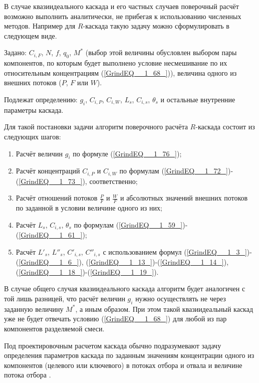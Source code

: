 В случае квазиидеального каскада и его частных случаев поверочный расчёт возможно выполнить аналитически, не прибегая к использованию численных методов. Например для $R$-каскада такую задачу можно сформулировать в следующем виде.

Задано: $C_{i,F}$, $N$, $f$, $q_0$, $M^{*}$ (выбор этой величины обусловлен выбором пары компонентов, по которым будет выполнено условие несмешивание по их относительным концентрациям (\ref{GrindEQ__1_68_})), величина одного из внешних потоков ($P$, $F$ или $W$).

Подлежат определению: $g_i$, $C_{i,P}$, $C_{i,W}$, $L_{s}$, $C_{i, s}$, $\theta_{s}$ и остальные внутренние параметры каскада.  

Для такой постановки задачи алгоритм поверочного расчёта $R$-каскада состоит из следующих шагов:

\begin{enumerate}
  \item Расчёт величин $g_i$ по формуле (\ref{GrindEQ__1_76_});
  \item Расчёт концентраций $C_{i,P}$ и $C_{i,W}$ по формулам (\ref{GrindEQ__1_72_})-(\ref{GrindEQ__1_73_}), соответственно;
  \item Расчёт отношений потоков  $\frac{P}{F}$ и $\frac{W}{F}$ и абсолютных значений внешних потоков по заданной в условии величине одного из них; 
  \item Расчёт $L_{s}$, $C_{i, s}$, $\theta_{s}$ по формулам (\ref{GrindEQ__1_59_})-(\ref{GrindEQ__1_61_});
  \item Расчёт ${L'}_{s}$, ${L''}_{s}$, $C'_{i, s} $, $C''_{i, s}$ с использованием формул (\ref{GrindEQ__1_3_})-(\ref{GrindEQ__1_6_}), (\ref{GrindEQ__1_13_})-(\ref{GrindEQ__1_14_}), (\ref{GrindEQ__1_18_})-(\ref{GrindEQ__1_19_}).
\end{enumerate}

В случае общего случая квазиидеального каскада алгоритм будет аналогичен с той лишь разницей, что расчёт величин $g_i$ нужно осуществлять не через заданную величину $M^{*}$, а иным образом. При этом такой квазиидеальный каскад уже не будет отвечать условию (\ref{GrindEQ__1_68_}) для любой из пар компонентов разделяемой смеси. 


Под проектировочным расчетом каскада обычно подразумевают задачу определения параметров каскада по заданным значениям концентрации одного из компонентов (целевого или ключевого) в потоках отбора и отвала и величине потока отбора \cite{sulaberidzeTeoriyaKaskadovDlya2011}.


